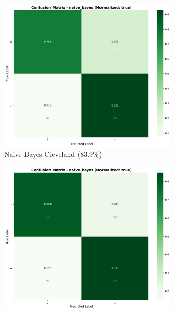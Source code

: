 \begin{figure}[H]
\centering
\begin{subfigure}[b]{0.31\textwidth}
\centering
\includegraphics[width=0.95\textwidth]{Result/cleveland_dataset/confusion_matrices/naive_bayes_numeric_dataset_StandardScaler.png}
\caption{Naive Bayes Cleveland (83.9\%)}
\label{fig:nb_cleveland_performance}
\end{subfigure}
\hfill
\begin{subfigure}[b]{0.31\textwidth}
\centering
\includegraphics[width=0.95\textwidth]{Result/heart_dataset/confusion_matrices/naive_bayes_numeric_dataset_StandardScaler.png}

\end{subfigure}
\end{figure}
